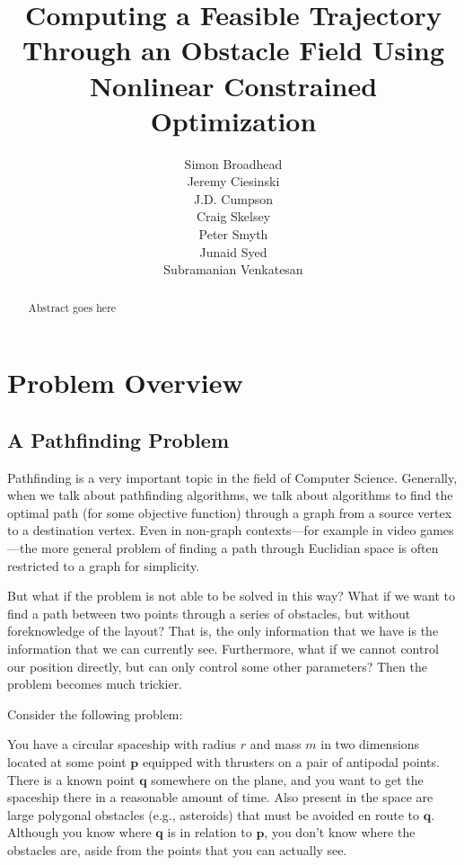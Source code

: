 \documentclass{report}
\begin{document}
\title{Computing a Feasible Trajectory Through an Obstacle Field Using Nonlinear Constrained Optimization}
\author{
    Simon Broadhead\\
    Jeremy Ciesinski\\
    J.D. Cumpson\\
    Craig Skelsey\\
    Peter Smyth\\
    Junaid Syed\\
    Subramanian Venkatesan
}
\maketitle

\begin{abstract}
Abstract goes here
\end{abstract}

\tableofcontents

\chapter{Problem Overview}
\section{A Pathfinding Problem}
Pathfinding is a very important topic in the field of Computer Science.
Generally, when we talk about pathfinding algorithms, we talk about
algorithms to find the optimal path (for some objective function) through
a graph from a source vertex to a destination vertex. Even in
non-graph contexts---for example in video games---the more general problem
of finding a path through Euclidian space is often restricted to a graph
for simplicity.

But what if the problem is not able to be solved in this way? What if
we want to find a path between two points through a series of obstacles,
but without foreknowledge of the layout? That is, the only information
that we have is the information that we can currently see. Furthermore,
what if we cannot control our position directly, but can only control
some other parameters? Then the problem becomes much trickier.
\vspace{0.5em}

Consider the following problem:
\vspace{0.5em}

You have a circular spaceship with radius $r$ and mass $m$
in two dimensions located at some point $\mathbf{p}$ equipped with thrusters
on a pair of antipodal points. There
is a known point $\mathbf{q}$ somewhere on the plane, and you want to
get the spaceship there in a reasonable amount of time. Also present
in the space are large polygonal obstacles (e.g., asteroids) 
that must be avoided en route
to $\mathbf{q}$. Although you know where $\mathbf{q}$ is in relation to
$\mathbf{p}$, you don't know where the obstacles are, aside from the
points that you can actually see.
\end{document}
